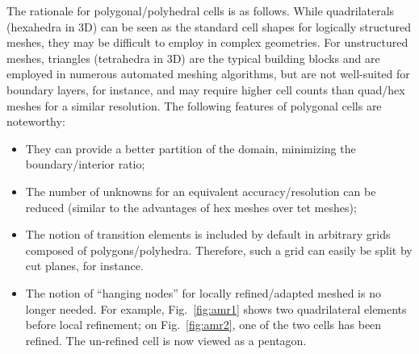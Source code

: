 \documentclass[preprint,10pt]{elsarticle}
\newcommand{\fig}[1]{Fig.~\ref{#1}}                      %
\begin{document}
The rationale for polygonal/polyhedral cells is as follows.
While quadrilaterals (hexahedra in 3D) can be seen as the standard cell shapes for logically 
structured meshes, they may be difficult to employ in complex geometries. For unstructured meshes,
triangles (tetrahedra in 3D) are the typical building blocks and are employed in 
numerous automated meshing algorithms, but are not well-suited for boundary layers, 
for instance, and may require higher cell counts than quad/hex meshes for a similar
resolution.  The following features of polygonal cells are noteworthy:
\begin{itemize}
  \item They can provide a better partition of the domain, minimizing the boundary/interior ratio;
  \item The number of unknowns for an equivalent accuracy/resolution can be reduced (similar to the advantages of 
	hex meshes over tet meshes);
	\item The notion of transition elements is included by default in arbitrary grids composed of
	polygons/polyhedra. Therefore, such a grid can easily be split by cut planes, for 
	instance. 
  \item The notion of ``hanging nodes'' for locally refined/adapted meshed is no longer needed.
	For example, \fig{fig:amr1} shows two quadrilateral elements before local refinement; on
	\fig{fig:amr2}, one of the two cells has been refined. The un-refined cell is now viewed as a
	pentagon.
\end{itemize}
\end{document}
